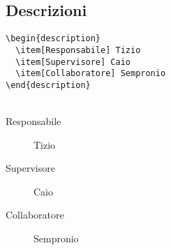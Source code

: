 \subsection{Descrizioni}
  \verb!\begin{description}              !\\
  \verb!  \item[Responsabile] Tizio      !\\
  \verb!  \item[Supervisore] Caio        !\\
  \verb!  \item[Collaboratore] Sempronio!\\
  \verb!\end{description}                !\\~
  \begin{description}
    \item[Responsabile] Tizio
    \item[Supervisore] Caio
    \item[Collaboratore] Sempronio
  \end{description}

